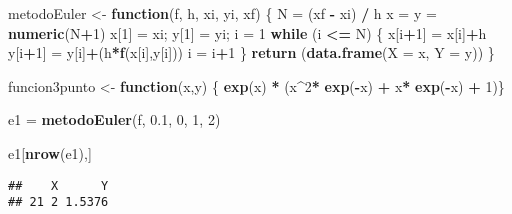 \documentclass[]{article}
\newenvironment{Shaded}{\begin{snugshade}}{\end{snugshade}}
\newcommand{\KeywordTok}[1]{\textcolor[rgb]{0.13,0.29,0.53}{\textbf{#1}}}
\newcommand{\DataTypeTok}[1]{\textcolor[rgb]{0.13,0.29,0.53}{#1}}
\newcommand{\DecValTok}[1]{\textcolor[rgb]{0.00,0.00,0.81}{#1}}
\newcommand{\FloatTok}[1]{\textcolor[rgb]{0.00,0.00,0.81}{#1}}
\newcommand{\StringTok}[1]{\textcolor[rgb]{0.31,0.60,0.02}{#1}}
\newcommand{\ControlFlowTok}[1]{\textcolor[rgb]{0.13,0.29,0.53}{\textbf{#1}}}
\newcommand{\OperatorTok}[1]{\textcolor[rgb]{0.81,0.36,0.00}{\textbf{#1}}}
\newcommand{\NormalTok}[1]{#1}
\begin{document}
\begin{Shaded}
\begin{Highlighting}[]
\NormalTok{metodoEuler <-}\StringTok{ }\ControlFlowTok{function}\NormalTok{(f, h, xi, yi, xf)}
\NormalTok{\{}
\NormalTok{  N =}\StringTok{ }\NormalTok{(xf }\OperatorTok{-}\StringTok{ }\NormalTok{xi) }\OperatorTok{/}\StringTok{ }\NormalTok{h}
\NormalTok{  x =}\StringTok{ }\NormalTok{y =}\StringTok{ }\KeywordTok{numeric}\NormalTok{(N}\OperatorTok{+}\DecValTok{1}\NormalTok{)}
\NormalTok{  x[}\DecValTok{1}\NormalTok{] =}\StringTok{ }\NormalTok{xi; }
\NormalTok{  y[}\DecValTok{1}\NormalTok{] =}\StringTok{ }\NormalTok{yi;}
\NormalTok{  i =}\StringTok{ }\DecValTok{1}
  \ControlFlowTok{while}\NormalTok{ (i }\OperatorTok{<=}\StringTok{ }\NormalTok{N)}
\NormalTok{  \{}
\NormalTok{    x[i}\OperatorTok{+}\DecValTok{1}\NormalTok{] =}\StringTok{ }\NormalTok{x[i]}\OperatorTok{+}\NormalTok{h}
\NormalTok{    y[i}\OperatorTok{+}\DecValTok{1}\NormalTok{] =}\StringTok{ }\NormalTok{y[i]}\OperatorTok{+}\NormalTok{(h}\OperatorTok{*}\KeywordTok{f}\NormalTok{(x[i],y[i]))}
\NormalTok{    i =}\StringTok{ }\NormalTok{i}\OperatorTok{+}\DecValTok{1}
\NormalTok{  \}}
  \KeywordTok{return}\NormalTok{ (}\KeywordTok{data.frame}\NormalTok{(}\DataTypeTok{X =}\NormalTok{ x, }\DataTypeTok{Y =}\NormalTok{ y))}
\NormalTok{\}}

\NormalTok{funcion3punto <-}\StringTok{ }\ControlFlowTok{function}\NormalTok{(x,y) \{ }\KeywordTok{exp}\NormalTok{(x) }\OperatorTok{*}\StringTok{ }\NormalTok{(x}\OperatorTok{^}\DecValTok{2}\OperatorTok{*}\StringTok{ }\KeywordTok{exp}\NormalTok{(}\OperatorTok{-}\NormalTok{x) }\OperatorTok{+}\StringTok{ }\NormalTok{x}\OperatorTok{*}\StringTok{ }\KeywordTok{exp}\NormalTok{(}\OperatorTok{-}\NormalTok{x) }\OperatorTok{+}\StringTok{ }\DecValTok{1}\NormalTok{)\}}

\NormalTok{e1 =}\StringTok{ }\KeywordTok{metodoEuler}\NormalTok{(f, }\FloatTok{0.1}\NormalTok{, }\DecValTok{0}\NormalTok{, }\DecValTok{1}\NormalTok{, }\DecValTok{2}\NormalTok{)}

\NormalTok{e1[}\KeywordTok{nrow}\NormalTok{(e1),]}
\end{Highlighting}
\end{Shaded}

\begin{verbatim}
##    X      Y
## 21 2 1.5376
\end{verbatim}
\end{document}
